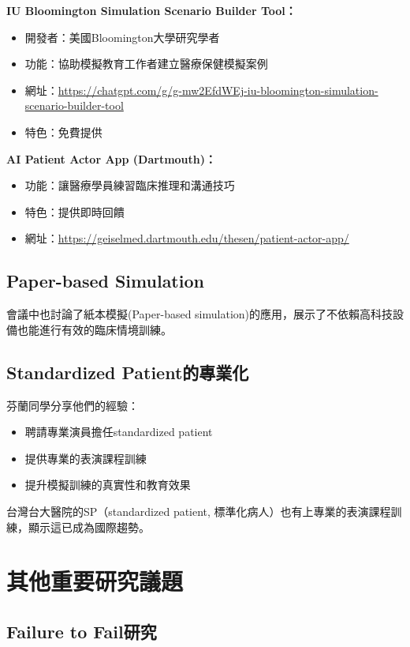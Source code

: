 \documentclass[12pt,a4paper]{article}
\newcommand{\note}[1]{
    \par
    \noindent
    \begin{tcolorbox}[
        colback=emergency_blue!5!white,
        colframe=emergency_blue,
        title=\textbf{重點提醒},
        fonttitle=\bfseries,
        boxrule=0.5pt,
        arc=3pt,
        left=6pt,
        right=6pt,
        top=6pt,
        bottom=6pt
    ]
    #1
    \end{tcolorbox}
}
\begin{document}
\textbf{IU Bloomington Simulation Scenario Builder Tool：}
\begin{itemize}[nosep]
    \item 開發者：美國Bloomington大學研究學者
    \item 功能：協助模擬教育工作者建立醫療保健模擬案例
    \item 網址：\url{https://chatgpt.com/g/g-mw2EfdWEj-iu-bloomington-simulation-scenario-builder-tool}
    \item 特色：免費提供
\end{itemize}

\textbf{AI Patient Actor App (Dartmouth)：}
\begin{itemize}[nosep]
    \item 功能：讓醫療學員練習臨床推理和溝通技巧
    \item 特色：提供即時回饋
    \item 網址：\url{https://geiselmed.dartmouth.edu/thesen/patient-actor-app/}
\end{itemize}

\subsection{Paper-based Simulation}

會議中也討論了紙本模擬(Paper-based simulation)的應用，展示了不依賴高科技設備也能進行有效的臨床情境訓練。

\subsection{Standardized Patient的專業化}

芬蘭同學分享他們的經驗：
\begin{itemize}[nosep]
    \item 聘請專業演員擔任standardized patient
    \item 提供專業的表演課程訓練
    \item 提升模擬訓練的真實性和教育效果
\end{itemize}

\vspace{0.5cm}
\note{
台灣台大醫院的SP（standardized patient, 標準化病人）也有上專業的表演課程訓練，顯示這已成為國際趨勢。
}

\section{其他重要研究議題}

\subsection{Failure to Fail研究}
\end{document}
